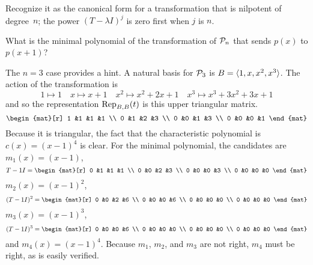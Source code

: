 \begin{exercises}
\begin{answer}
      Recognize it as the canonical form for a transformation that is 
      nilpotent of degree~$n$; the power $(T-\lambda I)^j$ is zero first
      when $j$ is $n$.
    \end{answer}
  \item 
    What is the minimal polynomial of the transformation of
    \( \polyspace_n \) that sends \( p(x) \) to \( p(x+1) \)?
    \begin{answer}
      The $n=3$ case provides a hint.
      A natural basis for $\polyspace_3$ is  
      $B=\sequence{1,x,x^2,x^3}$.
      The action of the transformation is
      \begin{equation*}
        1\mapsto 1
        \quad
        x\mapsto x+1
        \quad
        x^2\mapsto x^2+2x+1
        \quad
        x^3\mapsto x^3+3x^2+3x+1
      \end{equation*}
      and so the representation $\rep{t}{B,B}$ is this upper triangular matrix.
      \begin{equation*}
        \begin{mat}[r]
          1  &1  &1  &1  \\
          0  &1  &2  &3  \\
          0  &0  &1  &3  \\
          0  &0  &0  &1
        \end{mat}
      \end{equation*}
      Because it is triangular, the fact that the characteristic polynomial is
      $c(x)=(x-1)^4$ is clear.
      For the minimal polynomial, the candidates are $m_1(x)=(x-1)$,
      \begin{equation*}
        T-1I=
        \begin{mat}[r]
          0  &1  &1  &1  \\
          0  &0  &2  &3  \\
          0  &0  &0  &3  \\
          0  &0  &0  &0
        \end{mat}
      \end{equation*}
      $m_2(x)=(x-1)^2$, 
      \begin{equation*}
        (T-1I)^2=
        \begin{mat}[r]
          0  &0  &2  &6  \\
          0  &0  &0  &6  \\
          0  &0  &0  &0  \\
          0  &0  &0  &0
        \end{mat}
      \end{equation*}
      $m_3(x)=(x-1)^3$,
      \begin{equation*}
        (T-1I)^3=
        \begin{mat}[r]
          0  &0  &0  &6  \\
          0  &0  &0  &0  \\
          0  &0  &0  &0  \\
          0  &0  &0  &0
        \end{mat}
      \end{equation*}
      and $m_4(x)=(x-1)^4$.
      Because $m_1$, $m_2$, and $m_3$ are not right, $m_4$ must be right,
      as is easily verified.
      

\end{answer}
\end{exercises}
